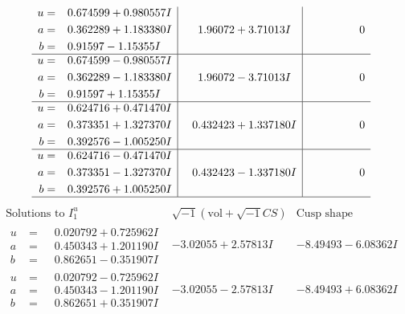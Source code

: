 \documentclass[1p]{elsarticle_modified}
\theoremstyle{definition}
\newcommand{\I}{\sqrt{-1}}
\begin{document}
$$\begin{array}{c|c|c}
\begin{aligned}
u &= \phantom{-}0.674599 + 0.980557 I \\
a &= \phantom{-}0.362289 + 1.183380 I \\
b &= \phantom{-}0.91597 - 1.15355 I\end{aligned}
 & \phantom{-}1.96072 + 3.71013 I & \phantom{-0.000000 } 0 \\ \hline\begin{aligned}
u &= \phantom{-}0.674599 - 0.980557 I \\
a &= \phantom{-}0.362289 - 1.183380 I \\
b &= \phantom{-}0.91597 + 1.15355 I\end{aligned}
 & \phantom{-}1.96072 - 3.71013 I & \phantom{-0.000000 } 0 \\ \hline\begin{aligned}
u &= \phantom{-}0.624716 + 0.471470 I \\
a &= \phantom{-}0.373351 + 1.327370 I \\
b &= \phantom{-}0.392576 - 1.005250 I\end{aligned}
 & \phantom{-}0.432423 + 1.337180 I & \phantom{-0.000000 } 0 \\ \hline\begin{aligned}
u &= \phantom{-}0.624716 - 0.471470 I \\
a &= \phantom{-}0.373351 - 1.327370 I \\
b &= \phantom{-}0.392576 + 1.005250 I\end{aligned}
 & \phantom{-}0.432423 - 1.337180 I & \phantom{-0.000000 } 0\\
 \hline 
 \end{array}$$\newpage$$\begin{array}{c|c|c}  
\text{Solutions to }I^u_{1}& \I (\text{vol} + \sqrt{-1}CS) & \text{Cusp shape}\\
 \hline 
\begin{aligned}
u &= \phantom{-}0.020792 + 0.725962 I \\
a &= \phantom{-}0.450343 + 1.201190 I \\
b &= \phantom{-}0.862651 - 0.351907 I\end{aligned}
 & -3.02055 + 2.57813 I & -8.49493 - 6.08362 I \\ \hline\begin{aligned}
u &= \phantom{-}0.020792 - 0.725962 I \\
a &= \phantom{-}0.450343 - 1.201190 I \\
b &= \phantom{-}0.862651 + 0.351907 I\end{aligned}
 & -3.02055 - 2.57813 I & -8.49493 + 6.08362 I \\ \hline\begin{aligned}

\end{aligned}
\end{array}$$
\end{document}
